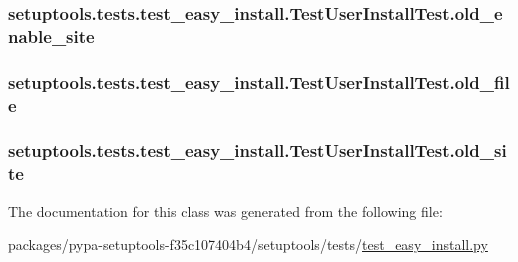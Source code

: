 \subsubsection[{old\+\_\+enable\+\_\+site}]{\setlength{\rightskip}{0pt plus 5cm}setuptools.\+tests.\+test\+\_\+easy\+\_\+install.\+Test\+User\+Install\+Test.\+old\+\_\+enable\+\_\+site}\label{classsetuptools_1_1tests_1_1test__easy__install_1_1TestUserInstallTest_ae69ba4e62a92acd2687b17d83189f1fd}
\hypertarget{classsetuptools_1_1tests_1_1test__easy__install_1_1TestUserInstallTest_ad4a18d1e54136b96ddcfc07a87df9bc6}{}
\subsubsection[{old\+\_\+file}]{\setlength{\rightskip}{0pt plus 5cm}setuptools.\+tests.\+test\+\_\+easy\+\_\+install.\+Test\+User\+Install\+Test.\+old\+\_\+file}\label{classsetuptools_1_1tests_1_1test__easy__install_1_1TestUserInstallTest_ad4a18d1e54136b96ddcfc07a87df9bc6}
\hypertarget{classsetuptools_1_1tests_1_1test__easy__install_1_1TestUserInstallTest_a732df3084c4c64884e62994e6955184f}{}
\subsubsection[{old\+\_\+site}]{\setlength{\rightskip}{0pt plus 5cm}setuptools.\+tests.\+test\+\_\+easy\+\_\+install.\+Test\+User\+Install\+Test.\+old\+\_\+site}\label{classsetuptools_1_1tests_1_1test__easy__install_1_1TestUserInstallTest_a732df3084c4c64884e62994e6955184f}


The documentation for this class was generated from the following file\+:\begin{DoxyCompactItemize}
\item 
packages/pypa-\/setuptools-\/f35c107404b4/setuptools/tests/\hyperlink{test__easy__install_8py}{test\+\_\+easy\+\_\+install.\+py}\end{DoxyCompactItemize}

